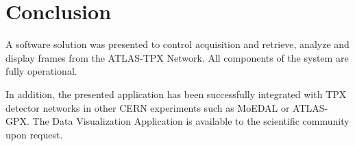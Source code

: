 

\section{\label{sec:conclusion}Conclusion}
A software solution was presented to control acquisition and retrieve, analyze and display frames from the ATLAS-TPX Network. All components of the system are fully operational.

In addition, the presented application has been successfully integrated with TPX detector networks in other CERN experiments such as MoEDAL or ATLAS-GPX. The Data Visualization Application is available to the scientific community upon request.
